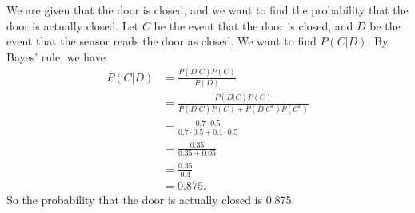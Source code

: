 \documentclass[12pt]{exam}
\begin{document}
\begin{solution}
	\begin{qparts}
		\item We are given that the door is closed, and we want to find the probability that the door is actually closed. Let $C$ be the event that the door is closed, and $D$ be the event that the sensor reads the door as closed. We want to find $P(C|D)$. By Bayes' rule, we have
		\begin{align*}
			P(C|D) & = \frac{P(D|C)P(C)}{P(D)}                             \\
			       & = \frac{P(D|C)P(C)}{P(D|C)P(C) + P(D|C^c)P(C^c)}      \\
			       & = \frac{0.7 \cdot 0.5}{0.7 \cdot 0.5 + 0.1 \cdot 0.5} \\
			       & = \frac{0.35}{0.35 + 0.05}                            \\
			       & = \frac{0.35}{0.4}                                    \\
			       & = 0.875.
		\end{align*}
		So the probability that the door is actually closed is 0.875.

	\end{qparts}

\end{solution}
\end{document}
